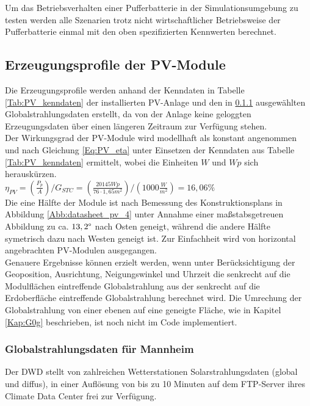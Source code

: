         Um das Betriebsverhalten einer Pufferbatterie in der Simulationsumgebung zu testen werden alle Szenarien trotz nicht wirtschaftlicher Betriebsweise der Pufferbatterie einmal mit den oben spezifizierten Kennwerten berechnet. \\
					
	\subsection{Erzeugungsprofile der PV-Module}
		\label{Kap:Sim_cfg_gen}
		Die Erzeugungsprofile werden anhand der Kenndaten in Tabelle \ref{Tab:PV_kenndaten} der installierten PV-Anlage und den in \ref{Kap:Sim_cfg_gen_data} ausgewählten Globalstrahlungsdaten erstellt, da von der Anlage keine geloggten Erzeugungsdaten über einen längeren Zeitraum zur Verfügung stehen. \\
	
		Der Wirkungsgrad der PV-Module wird modellhaft als konstant angenommen und nach Gleichung \ref{Eq:PV_eta} unter Einsetzen der Kenndaten aus Tabelle \ref{Tab:PV_kenndaten} ermittelt, wobei die Einheiten $W$ und $Wp$ sich herauskürzen. \\
		
			$ \eta_{PV} = (\frac{P_p}{A}) / G_{STC} = (\frac{20145 Wp}{76 \cdot 1,65 m^2}) / (1000 \frac{W}{m^2}) = 16,06 \% $ \\
			
		Die eine Hälfte der Module ist nach Bemessung des Konstruktionsplans in Abbildung \ref{Abb:datasheet_pv_4} unter Annahme einer maßstabsgetreuen Abbildung zu ca. $13,2 \degree$ nach Osten geneigt, während die andere Hälfte symetrisch dazu nach Westen geneigt ist. Zur Einfachheit wird von horizontal angebrachten PV-Modulen ausgegangen. \\
		
		Genauere Ergebnisse können erzielt werden, wenn unter Berücksichtigung der Geoposition, Ausrichtung, Neigungswinkel und Uhrzeit die senkrecht auf die Modulflächen eintreffende Globalstrahlung aus der senkrecht auf die Erdoberfläche eintreffende Globalstrahlung berechnet wird. Die Umrechung der Globalstrahlung von einer ebenen auf eine geneigte Fläche, wie in Kapitel \ref{Kap:G0g} beschrieben, ist noch nicht im Code implementiert. \\			

		\subsubsection{Globalstrahlungsdaten für Mannheim}	
			\label{Kap:Sim_cfg_gen_data}
			Der \ac{DWD} stellt von zahlreichen Wetterstationen Solarstrahlungsdaten (global und diffus), in einer Auflösung von bis zu 10 Minuten auf dem FTP-Server ihres Climate Data Center frei zur Verfügung.\cite{DWD} \\
			
